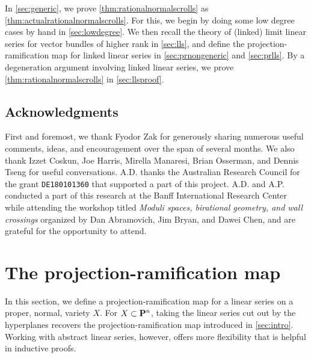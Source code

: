 \documentclass[11pt,reqno]{amsart}
\theoremstyle{plain}
\theoremstyle{definition}
\theoremstyle{remark}
\numberwithin{equation}{section}
\numberwithin{equation}{section}
\begin{document}
In \autoref{sec:generic}, we prove \autoref{thm:rationalnormalscrolls} as \autoref{thm:actualrationalnormalscrolls}.
For this, we begin by doing some low degree cases by hand in \autoref{sec:lowdegree}.
We then recall the theory of (linked) limit linear series for vector bundles of higher rank in \autoref{sec:lls}, and define the projection-ramification map for linked linear series in \autoref{sec:prnongeneric} and \autoref{sec:prlls}.
By a degeneration argument involving linked linear series, we prove \autoref{thm:rationalnormalscrolls} in \autoref{sec:llsproof}.


\subsection*{Acknowledgments}
First and foremost, we thank Fyodor Zak for generously sharing numerous useful comments, ideas, and encouragement over the span of several months.
We also thank Izzet Coskun, Joe Harris, Mirella Manaresi, Brian Osserman, and Dennis Tseng for useful conversations. 
A.D. thanks the Australian Research Council for the grant \texttt{DE180101360} that supported a part of this project.
A.D. and A.P. conducted a part of this research at the Banff International Research Center while attending the workshop titled \emph{Moduli spaces, birational geometry, and wall crossings} organized by Dan Abramovich, Jim Bryan, and Dawei Chen, and are grateful for the opportunity to attend.

\section{The projection-ramification map}\label{sec:prmap}
In this section, we define a projection-ramification map for a linear series on a proper, normal, variety $X$.
For $X \subset \P^n$, taking the linear series cut out by the hyperplanes recovers the projection-ramification map introduced in \autoref{sec:intro}.
Working with abstract linear series, however, offers more flexibility that is helpful in inductive proofs.
\end{document}
